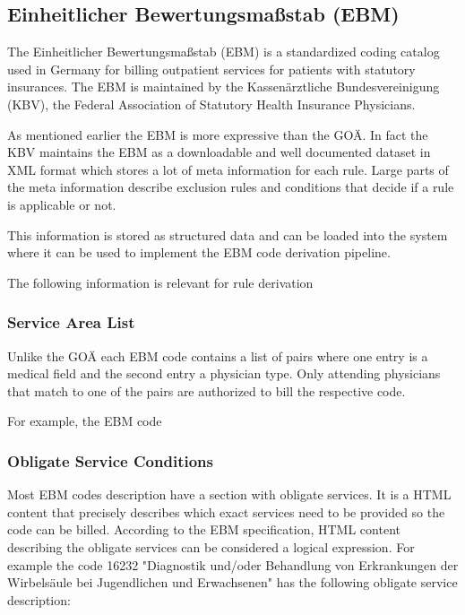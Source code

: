 \subsection{Einheitlicher Bewertungsmaßstab (EBM)}
The Einheitlicher Bewertungsmaßstab (EBM) is a standardized coding catalog used in Germany for billing outpatient services for patients with statutory insurances.
The EBM is maintained by the Kassenärztliche Bundesvereinigung (KBV), the Federal Association of Statutory Health Insurance Physicians\cite[]{hermanns2015ebm}.

As mentioned earlier the EBM is more expressive than the GOÄ.
In fact the KBV maintains the EBM as a downloadable and well documented dataset in XML format which stores a lot of meta information for each rule.
Large parts of the meta information describe exclusion rules and conditions that decide if a rule is applicable or not.

This information is stored as structured data and can be loaded into the system where it can be used to implement the EBM code derivation pipeline.

The following information is relevant for rule derivation
\subsubsection{Service Area List}
Unlike the GOÄ each EBM code contains a list of pairs where one entry is a medical field and the second entry a physician type.
Only attending physicians that match to one of the pairs are authorized to bill the respective code.

For example, the EBM code


\subsubsection{}



\subsubsection{Obligate Service Conditions}
Most EBM codes description have a section with obligate services.
It is a HTML content that precisely describes which exact services need to be provided so the code can be billed.
According to the EBM specification, HTML content describing the obligate services can be considered a logical expression.
For example the code 16232 "Diagnostik und/oder Behandlung von Erkrankungen der Wirbelsäule bei Jugendlichen und Erwachsenen" has the following obligate service description:


